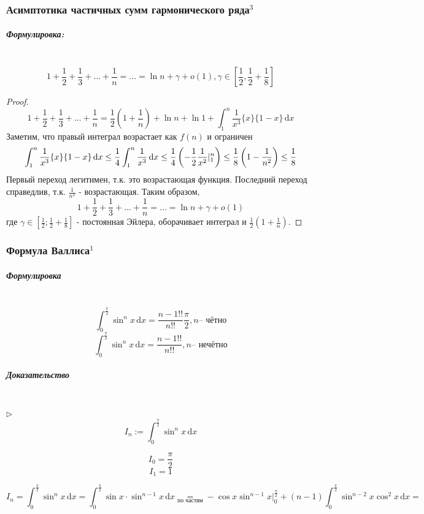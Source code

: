 \documentclass{article}
\def\D{\,\mathrm{d}}
\let\vanillasubparagraph\subparagraph
\renewcommand{\subparagraph}[1]{\vanillasubparagraph{#1}\mbox{}\\}
\begin{document}
\subsubsection{Асимптотика частичных сумм гармонического ряда\texorpdfstring{$^3$}{}}

\subparagraph{Формулировка:}

\[1 + \frac{1}{2} + \frac{1}{3} + \ldots + \frac{1}{n} = \ldots = \ln{n} + \gamma + o(1), \gamma \in \left[\frac{1}{2}, \frac{1}{2} + \frac{1}{8}\right]\]

\begin{proof}
\begin{equation*}
1 + \frac{1} {2} + \frac{1} {3} + \ldots + \frac{1} {n} = \frac{1} {2}\left(1 + \frac{1} {n}\right) + \ln{n} + \ln{1} + \int_1^n \frac{1}{x^3} \{x\} \{1 - x\} \D x
\end{equation*}
Заметим, что правый интеграл возрастает как $f(n)$ и ограничен
\begin{equation*}
\int_1^n \frac{1}{x^3} \{x\} \{1 - x\} \D x \leq \frac{1} {4}\int_1 ^n \frac{1} {x^3}\D x \leq \frac{1} {4} \left(-\frac{1} {2} \frac{1} {x^2} \arrowvert^n_1\right) \leq \frac{1} {8} \left(1 - \frac{1} {n^2}\right) \leq \frac{1} {8}
\end{equation*}
Первый переход легитимен, т.к. это возрастающая функция. Последний переход справедлив, т.к. $\frac{1} {n^2}$ - возрастающая.
Таким образом, 
\begin{equation}
1 + \frac{1}{2} + \frac{1}{3} + \ldots + \frac{1}{n} = \ldots = \ln{n} + \gamma + o(1)
\end{equation}
где $\gamma \in [\frac{1} {2}; \frac{1} {2} + \frac{1} {8}]$ - постоянная Эйлера, оборачивает интеграл и $\frac{1} {2}\left(1 + \frac{1} {n}\right)$. 
\end{proof}

\subsubsection{Формула Валлиса\texorpdfstring{$^1$}{}}\label{Валлис}
\subparagraph{Формулировка}
$$
\int_0^{\frac{\pi}{2}}\sin^n x \D x = \frac{n-1!!}{n!!}\frac{\pi}{2}, n\text{-- чётно}
$$
$$
\int_0^{\frac{\pi}{2}}\sin^n x \D x = \frac{n-1!!}{n!!}, n\text{-- нечётно}
$$

\subparagraph{Доказательство}
$\rhd$
$$
I_n := \int_0^{\frac{\pi}{2}}\sin^n x \D x
$$

$$
I_0 = \frac{\pi}{2}
$$
$$
I_1 = 1
$$

$$
I_n = \int_0^{\frac{\pi}{2}}\sin^n x \D x = \int_0^{\frac{\pi}{2}}\sin x \cdot \sin^{n-1}x \D x \underset{\text{по частям}}{=} -\cos x \sin^{n-1} x |_0^{\frac{\pi}{2}} + (n-1)\int_0^\frac{\pi}{2} \sin^{n-2}x \cos^2x \D x =
$$
\end{document}
